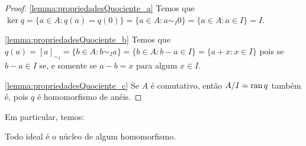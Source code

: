 \begin{proof}
    \ref{lemma:propriedadesQuociente_a} Temos que $\ker q=\{a \in A: q(a)=q(0)\}=\{a \in A: a\sim_I 0\}=\{a \in A: a\in I\}=I$.

    \ref{lemma:propriedadesQuociente_b} Temos que $q(a)=[a]_{\sim_I}=\{b \in A: b\sim_I a\}=\{b \in A: b-a\in I\}=\{a+x: x \in I\}$ pois se $b-a \in I$ se, e somente se $a-b=x$ para algum $x \in I$.

    \ref{lemma:propriedadesQuociente_c} Se $A$ é comutativo, então $A/I=\operatorname{ran} q$ também é, pois $q$ é homomorfismo de anéis.
\end{proof}

Em particular, temos:

\begin{corol}
    Todo ideal é o núcleo de algum homomorfismo.
\end{corol}

